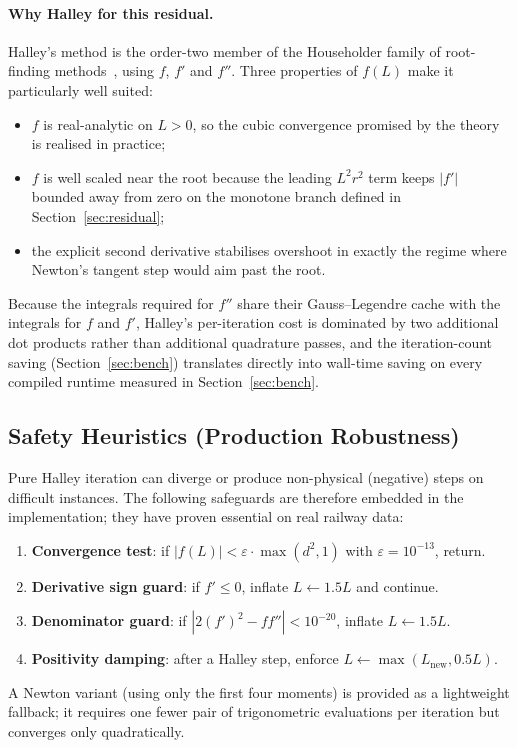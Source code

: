 \documentclass[11pt,a4paper]{article}
\begin{document}
\paragraph{Why Halley for this residual.}
Halley's method is the order-two member of the Householder family of root-finding methods~\citep{Householder1970}, using $f$, $f'$ and $f''$. Three properties of $f(L)$ make it particularly well suited:
\begin{itemize}
    \item $f$ is real-analytic on $L > 0$, so the cubic convergence promised by the theory is realised in practice;
    \item $f$ is well scaled near the root because the leading $L^2 r^2$ term keeps $|f'|$ bounded away from zero on the monotone branch defined in Section~\ref{sec:residual};
    \item the explicit second derivative stabilises overshoot in exactly the regime where Newton's tangent step would aim past the root.
\end{itemize}
Because the integrals required for $f''$ share their Gauss--Legendre cache with the integrals for $f$ and $f'$, Halley's per-iteration cost is dominated by two additional dot products rather than additional quadrature passes, and the iteration-count saving (Section~\ref{sec:bench}) translates directly into wall-time saving on every compiled runtime measured in Section~\ref{sec:bench}.

\subsection{Safety Heuristics (Production Robustness)}
Pure Halley iteration can diverge or produce non-physical (negative) steps on difficult instances. The following safeguards are therefore embedded in the implementation; they have proven essential on real railway data:
\begin{enumerate}
    \item \textbf{Convergence test}: if $|f(L)| < \varepsilon \cdot \max(d^2, 1)$ with $\varepsilon = 10^{-13}$, return.
    \item \textbf{Derivative sign guard}: if $f' \le 0$, inflate $L \leftarrow 1.5 L$ and continue.
    \item \textbf{Denominator guard}: if $|2(f')^2 - f f''| < 10^{-20}$, inflate $L \leftarrow 1.5 L$.
    \item \textbf{Positivity damping}: after a Halley step, enforce $L \leftarrow \max(L_{\text{new}}, 0.5 L)$.
\end{enumerate}
A Newton variant (using only the first four moments) is provided as a lightweight fallback; it requires one fewer pair of trigonometric evaluations per iteration but converges only quadratically.
\end{document}
